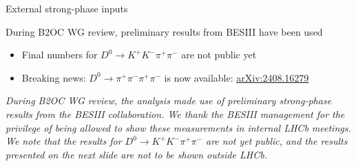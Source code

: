 \documentclass[xcolor={dvipsnames}]{beamer}
\begin{document}
\begin{frame}{External strong-phase inputs}
  \begin{center}
    During B2OC WG review, preliminary results from BESIII have been used
  \end{center}
  \begin{itemize}
    \item{Final numbers for $D^0\to K^+K^-\pi^+\pi^-$ are not public yet}
    \item{Breaking news: $D^0\to\pi^+\pi^-\pi^+\pi^-$ is now available: \href{https://arxiv.org/abs/2408.16279}{arXiv:2408.16279}}
  \end{itemize}
  \vspace{0.3cm}
  \begin{center}
    \textit{\color{blue}During B2OC WG review, the analysis made use of preliminary strong-phase results from the BESIII collaboration. We thank the BESIII management for the privilege of being allowed to show these measurements in internal LHCb meetings. We note that the results for $D^0\to K^+K^-\pi^+\pi^-$ are not yet public, and the results presented on the next slide are not to be shown outside LHCb.}
  \end{center}
\end{frame}
\end{document}
